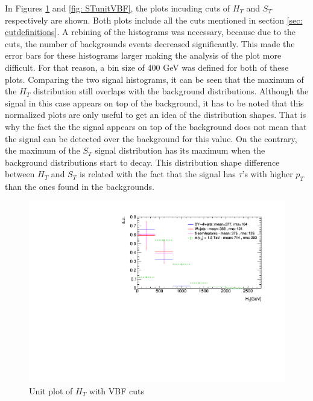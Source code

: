 In Figures \ref{fig: HTunitVBF} and \ref{fig: STunitVBF}, the plots incuding cuts of $H_{T}$ and $S_{T}$ respectively are shown. Both plots include all the cuts mentioned in section \ref{sec: cutdefinitions}. A rebining of the histograms was necessary, because due to the cuts, the number of backgrounds events decreased significantly. This made the error bars for these histograms larger making the analysis of the plot more difficult. For that reason, a bin size of 400 GeV was defined for both of these plots. Comparing the two signal histograms, it can be seen that the maximum of the $H_{T}$ distribution still overlaps with the background distributions. Although the signal in this case appears on top of the background, it has to be noted that this normalized plots are only useful to get an idea of the distribution shapes. That is why the fact the the signal appears on top of the background does not mean that the signal can be detected over the background for this value. On the contrary, the maximum of the $S_{T}$ signal distribution has its maximum when the background distributions start to decay. This distribution shape  difference between $H_{T}$ and $S_{T}$ is related with the fact that the signal has $\tau$'s with higher $p_{T}$ than the ones found in the backgrounds.

\begin{figure}
\begin{center}
 \includegraphics[width=\linewidth]{Figures/Plots/HT_unitVBF.pdf}
\end{center}
\caption{Unit plot of $H_{T}$ with VBF cuts}
\label{fig: HTunitVBF}
\end{figure}

